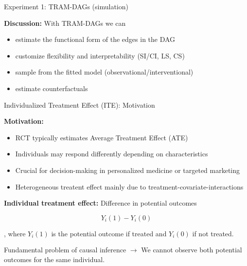 \documentclass[onlytextwidth,english]{beamer}\usepackage[]{graphicx}\usepackage[]{xcolor}
\begin{document}
\begin{frame}{Experiment 1: TRAM-DAGs (simulation)}


\textbf{Discussion:} With TRAM-DAGs we can

\begin{itemize}
    \item estimate the functional form of the edges in the DAG
    \item customize flexibility and interpretability (SI/CI, LS, CS)
    \item sample from the fitted model (observational/interventional)
    \item estimate counterfactuals
\end{itemize}
\end{frame}








\begin{frame}{Individualized Treatment Effect (ITE): Motivation}


\textbf{Motivation:}

\begin{itemize}
    \item RCT typically estimates Average Treatment Effect (ATE)
    \item Individuals may respond differently depending on characteristics
    \item Crucial for decision-making in personalized medicine or targeted marketing
    \item Heterogeneous treatent effect mainly due to treatment-covariate-interactions
\end{itemize}
    
\textbf{Individual treatment effect:} Difference in potential outcomes

\[
Y_i(1) - Y_i(0)
\]

, where $Y_i(1)$ is the potential outcome if treated and $Y_i(0)$ if not treated.


Fundamental problem of causal inference $\rightarrow$ We cannot observe both potential outcomes for the same individual.

\end{frame}
\end{document}
